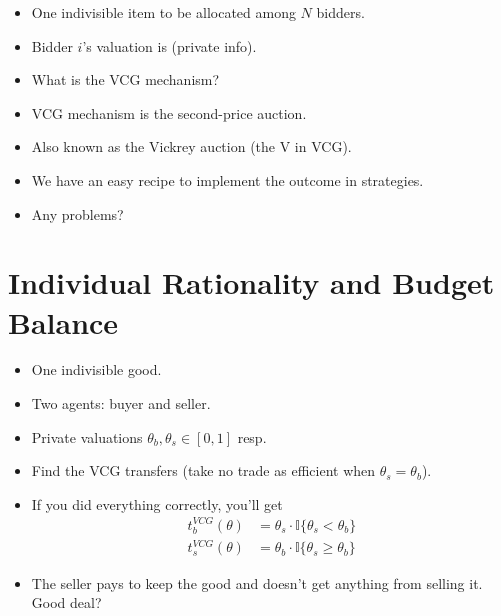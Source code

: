 \documentclass[english]{beamer}		%
\def\lyxframeend{} %
\begin{document}
\begin{example}[Auction]
	\begin{itemize}
		\item One indivisible item to be allocated among $N$ bidders.
		\item Bidder $i$'s valuation is  (private info).
		\item What is the VCG mechanism?
	\end{itemize}
\end{example}
\pause
\begin{itemize}
	\item VCG mechanism is the second-price auction.
	\item Also known as the Vickrey auction (the V in VCG).
\end{itemize}
\lyxframeend


\begin{itemize}
	\item We have an easy recipe to implement the  outcome in  strategies.
	\item Any problems?
\end{itemize}
\lyxframeend



\section{Individual Rationality and Budget Balance}

\begin{example}
	\begin{itemize}
		\item One indivisible good.
		\item Two agents: buyer and seller. 
		\item Private valuations $\theta_b,\theta_s \in [0,1]$ resp.
		\item Find the VCG transfers (take no trade as efficient when $\theta_s = \theta_b$).
	\end{itemize}
\end{example}
\lyxframeend


\begin{itemize}
	\item If you did everything correctly, you'll get
	\vspace{-0.5em}\begin{align*}
	t_b^{VCG}(\theta) &= \theta_s \cdot \mathbb{I} \{ \theta_s < \theta_b \} 
	\\ t_s^{VCG}(\theta) &= \theta_b \cdot \mathbb{I} \{ \theta_s \geq \theta_b \} 
	\end{align*}\vspace{-1em}
	\pause
	\item The seller pays to keep the good and doesn't get anything from selling it. Good deal?
\end{itemize}
\lyxframeend
\end{document}
